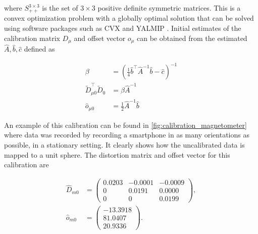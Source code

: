 where $S_{++}^{3 \times 3}$ is the set of $3 \times 3$ positive definite symmetric matrices. This is a convex optimization problem with a globally optimal solution that can be solved using software packages such as CVX \cite{cvx} and YALMIP \cite{Lofberg2004}. Initial estimates of the calibration matrix $D_\mu$ and offset vector $o_\mu$ can be obtained from the estimated $\widehat{A}, \widehat{b}, \widehat{c}$ defined as

\begin{subequations}
	\begin{align}
		\beta &=\left(\frac{1}{4} \hat{b}^{\top} \widehat{A}^{-1} \widehat{b}-\widehat{c}\right)^{-1} \\
		\widetilde{D}_{\mu 0}^{\top} \widetilde{D}_{0} &=\beta \widehat{A}^{-1} \\
		\widehat{o}_{\mu 0} &=\frac{1}{2} \widehat{A}^{-1} \widehat{b}
	\end{align}
\end{subequations}

An example of this calibration can be found in \cref{fig:calibration_magnetometer} where data was recorded by recording a smartphone in as many orientations as possible, in a stationary setting. It clearly shows how the uncalibrated data is mapped to a unit sphere. The distortion matrix and offset vector for this calibration are 

\begin{subequations}
	\begin{align}
	\widehat{D}_{m0} &= \left(\begin{array}{rrr}
		0.0203 & -0.0001 & -0.0009 \\
		0 & 0.0191 & 0.0000 \\
		0 & 0 & 0.0199
	\end{array}\right), \\
	\widehat{o}_{m0} &= \left(\begin{array}{r}
		-13.3918 \\
		81.0407 \\
		20.9336
	\end{array}\right).
	\end{align}
	
\end{subequations}

